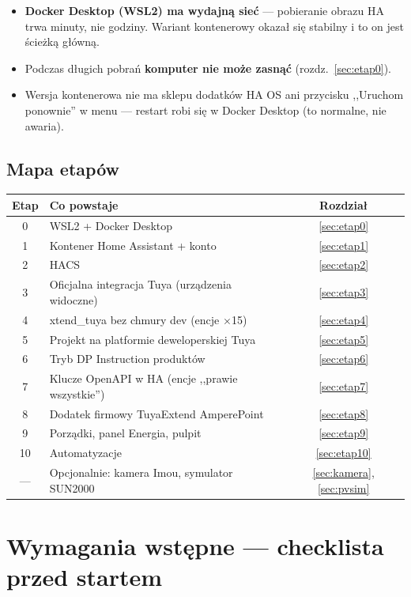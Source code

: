 \documentclass[11pt,a4paper]{article}
\begin{document}
\begin{itemize}
\item \textbf{Docker Desktop (WSL2) ma wydajną sieć} --- pobieranie obrazu HA trwa minuty, nie godziny. Wariant kontenerowy okazał się stabilny i to on jest ścieżką główną.
\item Podczas długich pobrań \textbf{komputer nie może zasnąć} (rozdz.~\ref{sec:etap0}).
\item Wersja kontenerowa nie ma sklepu dodatków HA OS ani przycisku ,,Uruchom ponownie'' w menu --- restart robi się w Docker Desktop (to normalne, nie awaria).
\end{itemize}

\subsection{Mapa etapów}

\begin{center}
\begin{tabular}{clc}
\toprule
\textbf{Etap} & \textbf{Co powstaje} & \textbf{Rozdział}\\
\midrule
0 & WSL2 + Docker Desktop & \ref{sec:etap0}\\
1 & Kontener Home Assistant + konto & \ref{sec:etap1}\\
2 & HACS & \ref{sec:etap2}\\
3 & Oficjalna integracja Tuya (urządzenia widoczne) & \ref{sec:etap3}\\
4 & xtend\_tuya bez chmury dev (encje $\times$15) & \ref{sec:etap4}\\
5 & Projekt na platformie deweloperskiej Tuya & \ref{sec:etap5}\\
6 & Tryb DP Instruction produktów & \ref{sec:etap6}\\
7 & Klucze OpenAPI w HA (encje ,,prawie wszystkie'') & \ref{sec:etap7}\\
8 & Dodatek firmowy TuyaExtend AmperePoint & \ref{sec:etap8}\\
9 & Porządki, panel Energia, pulpit & \ref{sec:etap9}\\
10 & Automatyzacje & \ref{sec:etap10}\\
--- & Opcjonalnie: kamera Imou, symulator SUN2000 & \ref{sec:kamera}, \ref{sec:pvsim}\\
\bottomrule
\end{tabular}
\end{center}

\section{Wymagania wstępne --- checklista przed startem}
\end{document}

